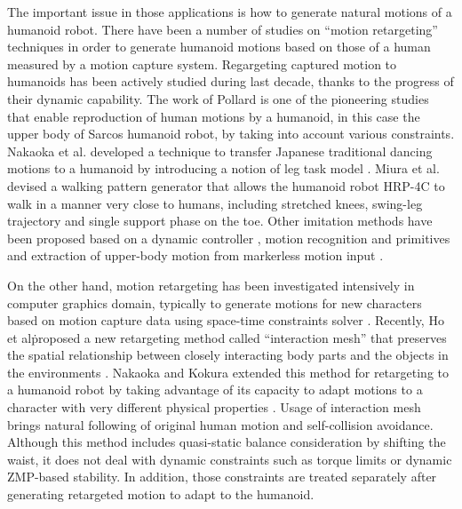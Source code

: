 \documentclass[letterpaper, 10 pt, conference]{ieeeconf}  %
\begin{document}
The important issue in those applications is how to generate natural
motions of a humanoid robot.
There have been a number of studies on ``motion retargeting''
techniques in order to
generate humanoid motions based on those of a human measured by a
motion capture system.
Regargeting captured motion to humanoids has been
actively studied during last decade, thanks to the progress of their
dynamic capability. The work of Pollard \cite{Pollard02ICRA} is one of
the pioneering studies that enable reproduction of human motions
by a humanoid, in this case the upper body of Sarcos humanoid robot,
by taking into account various constraints.
Nakaoka et al. developed a technique to  transfer
Japanese traditional dancing motions  to a humanoid by introducing a
notion of leg task model \cite{nakaoka_icra2004,nakaoka_2007}.
Miura et al. \cite{Miura11IROS} devised a walking pattern generator
that allows the humanoid robot HRP-4C to walk in a manner very close
to humans, including stretched knees, swing-leg trajectory and single
support phase on the toe.
Other imitation methods have been proposed based on a dynamic
controller  \cite{Yamane11humanoids,Ramos11humanoids},
motion recognition and primitives \cite{Ott08humanoids} and
extraction of upper-body motion from markerless motion input
\cite{Dariush08IROS,Do08humanoids}.



%


On the other hand, motion retargeting has been investigated
intensively in computer graphics domain, typically to generate motions
for new characters based on motion capture data using space-time
constraints solver \cite{Gleicher98}.  Recently, Ho et al\. proposed a
new retargeting method called ``interaction mesh'' that preserves the
spatial relationship between closely interacting body parts and the
objects in the environments \cite{Komura10}.  Nakaoka and Kokura
extended this method for retargeting to a humanoid robot by taking
advantage of its capacity to adapt motions to a character with very
different physical properties \cite{Nakaoka12Humanoids}. Usage of
interaction mesh brings natural following of original human motion and
self-collision avoidance.  Although this method includes quasi-static
balance consideration by shifting the waist, it does not deal with
dynamic constraints such as torque limits or dynamic ZMP-based
stability. In addition, those constraints are treated separately after
generating retargeted motion to adapt to the humanoid.
\end{document}
